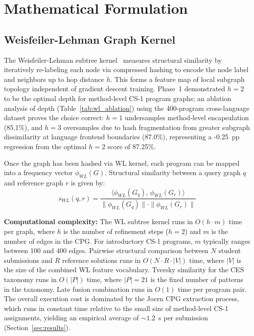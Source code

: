 \section{Mathematical Formulation}
\label{sec:implementation}

\subsection{Weisfeiler-Lehman Graph Kernel}
\label{subsec:wl_kernel}

The Weisfeiler-Lehman subtree kernel~\cite{ref_shervashidze2011} measures structural similarity by iteratively re-labeling each node via compressed hashing to encode the node label and neighbors up to hop distance $h$. This forms a feature map of local subgraph topology independent of gradient descent training. Phase~1 demonstrated $h=2$ to be the optimal depth for method-level CS-1 program graphs; an ablation analysis of depth (Table~\ref{tab:wl_ablation}) using the 400-program cross-language dataset proves the choice correct: $h=1$ undersamples method-level encapsulation (85.1\%), and $h=3$ oversamples due to hash fragmentation from greater subgraph dissimilarity at language frontend boundaries (87.0\%), representing a -0.25~pp regression from the optimal $h=2$ score of 87.25\%.

Once the graph has been hashed via WL kernel, each program can be mapped into a frequency vector $\phi_{WL}(G)$. Structural similarity between a query graph $q$ and reference graph $r$ is given by:
\begin{equation}
    s_{WL}(q,r) = \frac{\langle \phi_{WL}(G_q),\, \phi_{WL}(G_r) \rangle}{\|\phi_{WL}(G_q)\| \cdot \|\phi_{WL}(G_r)\|}
\end{equation}

\textbf{Computational complexity:} The WL subtree kernel runs in $O(h \cdot m)$ time per graph, where $h$ is the number of refinement steps ($h{=}2$) and $m$ is the number of edges in the CPG. For introductory CS-1 programs, $m$ typically ranges between 100 and 400 edges. Pairwise structural comparison between $N$ student submissions and $R$ reference solutions runs in $O(N \cdot R \cdot |V|)$ time, where $|V|$ is the size of the combined WL feature vocabulary. Tversky similarity for the CES taxonomy runs in $O(|P|)$ time, where $|P|{=}21$ is the fixed number of patterns in the taxonomy. Late fusion combination runs in $O(1)$ time per program pair. The overall execution cost is dominated by the Joern CPG extraction process, which runs in constant time relative to the small size of method-level CS-1 assignments, yielding an empirical average of ${\sim}1.2$~s per submission (Section~\ref{sec:results}).

